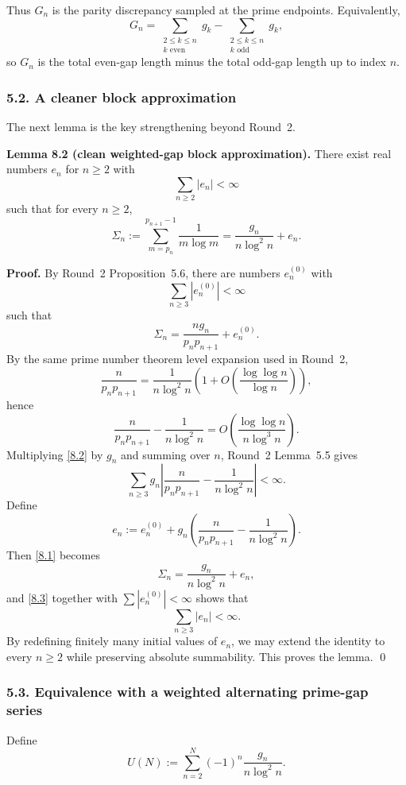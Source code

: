 \medskip

Thus $G_n$ is the parity discrepancy sampled at the prime endpoints. Equivalently,
\[
G_n
=
\sum_{\substack{2\le k\le n \\ k\text{ even}}} g_k
-
\sum_{\substack{2\le k\le n \\ k\text{ odd}}} g_k,
\]
so $G_n$ is the total even-gap length minus the total odd-gap length up to index $n$.

\subsubsection*{5.2. A cleaner block approximation}

The next lemma is the key strengthening beyond Round~2.

\textbf{Lemma 8.2 (clean weighted-gap block approximation).}
There exist real numbers $e_n$ for $n\ge 2$ with
\[
\sum_{n\ge 2}|e_n|<\infty
\]
such that for every $n\ge 2$,
\[
\Sigma_n:=\sum_{m=p_n}^{p_{n+1}-1}\frac{1}{m\log m}
=
\frac{g_n}{n\log^2 n}+e_n.
\]

\textbf{Proof.}
By Round~2 Proposition~5.6, there are numbers $e_n^{(0)}$ with
\[
\sum_{n\ge 3}|e_n^{(0)}|<\infty
\]
such that
\[
\Sigma_n = \frac{n g_n}{p_n p_{n+1}} + e_n^{(0)}.
\tag{8.1}
\]
By the same prime number theorem level expansion used in Round~2,
\[
\frac{n}{p_n p_{n+1}}
=
\frac{1}{n\log^2 n}
\left(1+O\!\left(\frac{\log\log n}{\log n}\right)\right),
\]
hence
\[
\frac{n}{p_n p_{n+1}} - \frac{1}{n\log^2 n}
=
O\!\left(\frac{\log\log n}{n\log^3 n}\right).
\tag{8.2}
\]
Multiplying \eqref{8.2} by $g_n$ and summing over $n$, Round~2 Lemma~5.5 gives
\[
\sum_{n\ge 3} g_n\left|\frac{n}{p_n p_{n+1}} - \frac{1}{n\log^2 n}\right| < \infty.
\tag{8.3}
\]
Define
\[
e_n := e_n^{(0)} + g_n\left(\frac{n}{p_n p_{n+1}} - \frac{1}{n\log^2 n}\right).
\]
Then \eqref{8.1} becomes
\[
\Sigma_n = \frac{g_n}{n\log^2 n}+e_n,
\]
and \eqref{8.3} together with $\sum |e_n^{(0)}|<\infty$ shows that
\[
\sum_{n\ge 3}|e_n|<\infty.
\]
By redefining finitely many initial values of $e_n$, we may extend the identity to every $n\ge 2$ while preserving absolute summability. This proves the lemma. \qed

\subsubsection*{5.3. Equivalence with a weighted alternating prime-gap series}

Define
\[
U(N):=\sum_{n=2}^N (-1)^n \frac{g_n}{n\log^2 n}.
\]

